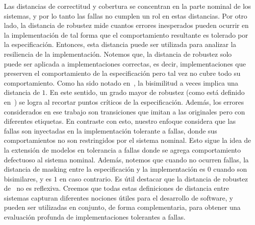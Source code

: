 Las distancias de correctitud y cobertura se concentran en la parte nominal de los sistemas, y por lo tanto las fallas no cumplen un rol en estas distancias. Por otro lado, la distancia de robustez mide cuantos errores inesperados pueden ocurrir en la implementación de tal forma que el comportamiento resultante es tolerado por la especificación. Entonces, esta distancia puede ser utilizada para analizar la resiliencia de la implementación. Notemos que, la distancia de robustez solo puede ser aplicada a implementaciones correctas, es decir, implementaciones que preserven el comportamiento de la especificación pero tal vez no cubre todo su comportamiento. 
 Como ha sido notado en~\cite{CernyHR12}, la bisimilitud a veces implica una distancia de $1$. En este sentido, un grado mayor de robustez (como está definido en~\cite{CernyHR12}) se logra al recortar puntos críticos de la especificación. Además, los errores considerados en ese trabajo son transiciones que imitan a las originales pero con diferentes etiquetas. En contraste con esto, nuestro enfoque considera que las fallas son inyectadas en la implementación tolerante a fallas, donde sus comportamientos no son restringidos por el sistema nominal. Esto sigue la idea de la extensión de modelos en tolerancia a fallas donde se agrega comportamiento defectuoso al sistema nominal. Además, notemos que cuando no ocurren fallas, la distancia de masking entre la especificación y la implementación es $0$ cuando son bisimilares, y es  $1$ en caso contrario.
Es útil destacar que la distancia de robustez de~\cite{CernyHR12} no es reflexiva. Creemos que todas estas definiciones de distancia entre sistemas capturan diferentes nociones útiles para el desarrollo de software, y pueden ser utilizadas en conjunto, de forma complementaria, para obtener una evaluación profunda de implementaciones tolerantes a fallas.





